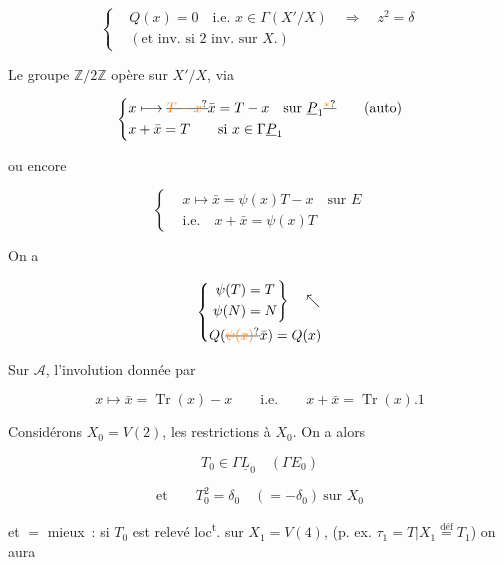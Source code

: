 \[
\left\{\begin{aligned}
&Q(x)=0\quad\text{i.e. }x\in\Gamma(X'/X)\quad\Longrightarrow\quad\boxed{z^2=\delta}\\
&(\text{et inv. si }2\text{ inv. sur }X.)
\end{aligned}\right.
\]


Le groupe $\mathbb Z/2\mathbb Z$ opère sur $X'/X$, via

\[
\left\{\begin{aligned}
&x\longmapsto\deleted{\unsure{T-x}}\bar x=T-x\quad\text{sur }\underline P_1\deleted{\unsure{^{*}}}\qquad(\text{auto})\\
&x+\bar x=T\qquad\text{si }x\in\Gamma\underline P_1
\end{aligned}\right.
\]

ou encore

\[
\left\{\begin{aligned}
&x\longmapsto\bar x=\psi(x)T-x\quad\text{sur }E\\
&\text{i.e.}\quad x+\bar x=\psi(x)T
\end{aligned}\right.
\]

On a

\[
\left\{\begin{aligned}
&\left.\begin{aligned}\psi(T)&=T\\\psi(N)&=N\end{aligned}\right\}\quad\nwarrow\\
&Q(\deleted{\unsure{\psi(x)}}\bar x)=Q(x)
\end{aligned}\right.
\]

Sur $\mathscr A$, l'involution donnée par

\[
x\longmapsto\bar x=\operatorname{Tr}(x)-x\qquad\text{i.e.}\qquad x+\bar x=\operatorname{Tr}(x).1
\]

Considérons $X_0=V(2)$,   les restrictions à $X_0$. On a  alors

\[
T_0\in\Gamma\underline L_0\quad(\Gamma E_0)
\]

\[
\text{et}\qquad T_0^2=\delta_0\quad(=-\delta_0)\ \text{sur }X_0
\]

et $=$ mieux~: si $T_0$ est relevé loc\textsuperscript{t}.  sur $X_1=V(4)$,  (p. ex. $\tau_1=T|X_1\overset{\mathrm{déf}}=T_1$) on aura

